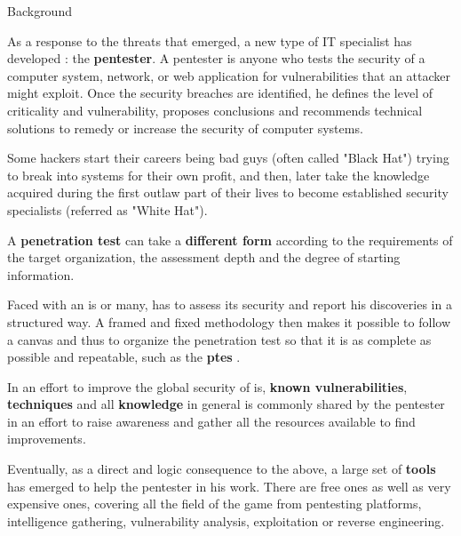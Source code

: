 \begin{chaptercover}{Background}
\begin{summary}
As a response to the threats that emerged, a new type of IT specialist has developed : the \textbf{pentester}. A pentester is anyone who tests the security of a computer system, network, or web application for vulnerabilities that an attacker might exploit. Once the security breaches are identified, he defines the level of criticality and vulnerability, proposes conclusions and recommends technical solutions to remedy or increase the security of computer systems.

\begin{info}
Some hackers start their careers being bad guys (often called "Black Hat") trying to break into systems for their own profit, and then, later take the knowledge acquired during the first outlaw part of their lives to become established security specialists (referred as "White Hat").
\end{info}

A \textbf{penetration test} can take a \textbf{different form} according to the requirements of the target organization, the assessment depth and the degree of starting information.

Faced with an \acrshort{is} or many, has to assess its security and report his discoveries in a structured way. A framed and fixed methodology then makes it possible to follow a canvas and thus to organize the penetration test so that it is as complete as possible and repeatable, such as the \textbf{\acrshort{ptes}} \cite{ptes}.

In an effort to improve the global security of \acrshort{is}, \textbf{known vulnerabilities}, \textbf{techniques} and all \textbf{knowledge} in general is commonly shared by the pentester in an effort to raise awareness and gather all the resources available to find improvements.

Eventually, as a direct and logic consequence to the above, a large set of \textbf{tools} has emerged to help the pentester in his work. There are free ones as well as very expensive ones, covering all the field of the game from pentesting platforms, intelligence gathering, vulnerability analysis, exploitation or reverse engineering.
\end{summary}

\begin{discussion}
\end{discussion}

\end{chaptercover}
